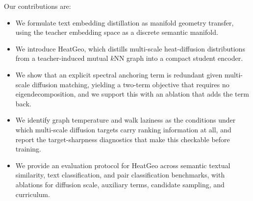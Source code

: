 Our contributions are:
\begin{itemize}
    \item We formulate text embedding distillation as manifold geometry transfer, using the teacher embedding space as a discrete semantic manifold.
    \item We introduce HeatGeo, which distills multi-scale heat-diffusion distributions from a teacher-induced mutual $k$NN graph into a compact student encoder.
    \item We show that an explicit spectral anchoring term is redundant given multi-scale diffusion matching, yielding a two-term objective that requires no eigendecomposition, and we support this with an ablation that adds the term back.
    \item We identify graph temperature and walk laziness as the conditions under which multi-scale diffusion targets carry ranking information at all, and report the target-sharpness diagnostics that make this checkable before training.
    \item We provide an evaluation protocol for HeatGeo across semantic textual similarity, text classification, and pair classification benchmarks, with ablations for diffusion scale, auxiliary terms, candidate sampling, and curriculum.
\end{itemize}
